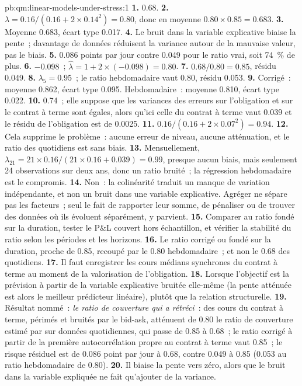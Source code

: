\begin{solution}{pb:qm:linear-models-under-stress:1}
\textbf{1.} 0.68.
\textbf{2.} $\lambda = 0.16/(0.16 + 2 \times 0.14^2) = 0.80$, donc en moyenne $0.80 \times 0.85 = 0.683$.
\textbf{3.} Moyenne 0.683, écart type 0.017.
\textbf{4.} Le bruit dans la variable explicative biaise la pente~; davantage de données réduisent la variance autour de la mauvaise valeur, pas le biais.
\textbf{5.} 0.086 points par jour contre 0.049 pour le ratio vrai, soit 74~\% de plus.
\textbf{6.} $-0.098$~; $\hat\lambda = 1 + 2 \times (-0.098) = 0.80$.
\textbf{7.} $0.68/0.80 = 0.85$, résidu 0.049.
\textbf{8.} $\lambda_5 = 0.95$~; le ratio hebdomadaire vaut 0.80, résidu 0.053.
\textbf{9.} Corrigé~: moyenne 0.862, écart type 0.095. Hebdomadaire~: moyenne 0.810, écart type 0.022.
\textbf{10.} 0.74~; elle suppose que les variances des erreurs sur l'obligation et sur le contrat à terme sont égales, alors qu'ici celle du contrat à terme vaut 0.039 et le résidu de l'obligation
est de 0.0025.
\textbf{11.} $0.16/(0.16 + 2 \times 0.07^2) = 0.94$.
\textbf{12.} Cela supprime le problème~: aucune erreur de niveau, aucune atténuation, et le ratio des  quotidiens est sans biais.
\textbf{13.} Mensuellement, $\lambda_{21} = 21 \times 0.16/(21 \times 0.16 + 0.039) = 0.99$, presque aucun biais, mais seulement 24 observations sur deux ans, donc un
ratio bruité~; la régression hebdomadaire est le compromis.
\textbf{14.} Non~: la colinéarité traduit un manque de variation indépendante, et non un bruit dans une variable explicative. Agréger ne sépare pas les facteurs~; seul le fait de rapporter
leur somme, de pénaliser ou de trouver des données où ils évoluent séparément, y parvient.
\textbf{15.} Comparer au ratio fondé sur la duration, tester le P\&L couvert hors échantillon, et vérifier la stabilité du ratio selon les périodes et
les horizons.
\textbf{16.} Le ratio corrigé ou fondé sur la duration, proche de 0.85, recoupé par le 0.80 hebdomadaire~; et non le 0.68 des  quotidiens.
\textbf{17.} Il faut enregistrer les cours médians synchrones du contrat à terme au moment de la valorisation de l'obligation.
\textbf{18.} Lorsque l'objectif est la prévision à partir de la variable explicative bruitée elle-même (la pente atténuée est alors le meilleur prédicteur linéaire), plutôt que la
relation structurelle.
\textbf{19.} Résultat nommé~: \emph{le ratio de couverture qui a rétréci}~: des cours du contrat à terme, périmés et bruités par le bid-ask, atténuent de 0.80 le ratio de couverture estimé par  sur données quotidiennes, qui passe de
0.85 à 0.68~; le ratio corrigé à partir de la première autocorrélation propre au contrat à terme vaut 0.85~; le risque résiduel est de 0.086 point par jour à 0.68, contre 0.049
à 0.85 (0.053 au ratio hebdomadaire de 0.80).
\textbf{20.} Il biaise la pente vers zéro, alors que le bruit dans la variable expliquée ne fait qu'ajouter de la variance.
\end{solution}

